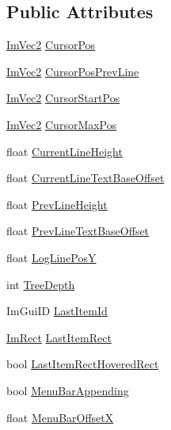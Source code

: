 \subsection*{Public Attributes}
\begin{DoxyCompactItemize}
\item 
\hyperlink{struct_im_vec2}{Im\+Vec2} \hyperlink{struct_im_gui_draw_context_a1f566246492e0995b5182de23633dc9a}{Cursor\+Pos}
\item 
\hyperlink{struct_im_vec2}{Im\+Vec2} \hyperlink{struct_im_gui_draw_context_adf64144a8421a21d7350d0452739eca2}{Cursor\+Pos\+Prev\+Line}
\item 
\hyperlink{struct_im_vec2}{Im\+Vec2} \hyperlink{struct_im_gui_draw_context_aef16fef5d6781908d806479fd37f393f}{Cursor\+Start\+Pos}
\item 
\hyperlink{struct_im_vec2}{Im\+Vec2} \hyperlink{struct_im_gui_draw_context_add16f0294ab2fd07b354da2bb99e43e1}{Cursor\+Max\+Pos}
\item 
float \hyperlink{struct_im_gui_draw_context_a950b71358ebfed5a884936f5cafed873}{Current\+Line\+Height}
\item 
float \hyperlink{struct_im_gui_draw_context_af6f0a3536765c5f638fd198749bf29f1}{Current\+Line\+Text\+Base\+Offset}
\item 
float \hyperlink{struct_im_gui_draw_context_ab4f6d19a049cff7a2fa5d1e9f5f132ab}{Prev\+Line\+Height}
\item 
float \hyperlink{struct_im_gui_draw_context_a72d618764e8a78c5bb7879ad2fe5e308}{Prev\+Line\+Text\+Base\+Offset}
\item 
float \hyperlink{struct_im_gui_draw_context_a4060735d06c860014c5359bcf76b1112}{Log\+Line\+PosY}
\item 
int \hyperlink{struct_im_gui_draw_context_a08d8578fe382425a67b4f5e5257b5436}{Tree\+Depth}
\item 
Im\+Gui\+ID \hyperlink{struct_im_gui_draw_context_ad864847097dd259ce9cb69558173fe45}{Last\+Item\+Id}
\item 
\hyperlink{struct_im_rect}{Im\+Rect} \hyperlink{struct_im_gui_draw_context_a214683a9c08e5812a492881791cd2f51}{Last\+Item\+Rect}
\item 
bool \hyperlink{struct_im_gui_draw_context_ad6f4bf282ceef2a07cf25a59008feb16}{Last\+Item\+Rect\+Hovered\+Rect}
\item 
bool \hyperlink{struct_im_gui_draw_context_a01e52aff3f5efc13fcf6af213cf417c2}{Menu\+Bar\+Appending}
\item 
float \hyperlink{struct_im_gui_draw_context_a18a950aff641d2a87a3057e9449fdf36}{Menu\+Bar\+OffsetX}

\end{DoxyCompactItemize}
